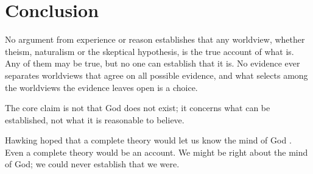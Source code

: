 \section{Conclusion}\label{sec:conclusion}

No argument from experience or reason establishes that any worldview, whether theism, naturalism
or the skeptical hypothesis, is the true account of what is. Any of them may be true, but no one
can establish that it is. No evidence ever separates worldviews that agree on all possible
evidence, and what selects among the worldviews the evidence leaves open is a choice.

The core claim is not that God does not exist; it concerns what can be established, not what it is
reasonable to believe.

Hawking hoped that a complete theory would let us know the mind of God \citep{hawking1988}. Even a
complete theory would be an account. We might be right about the mind of God; we could
never establish that we were.
